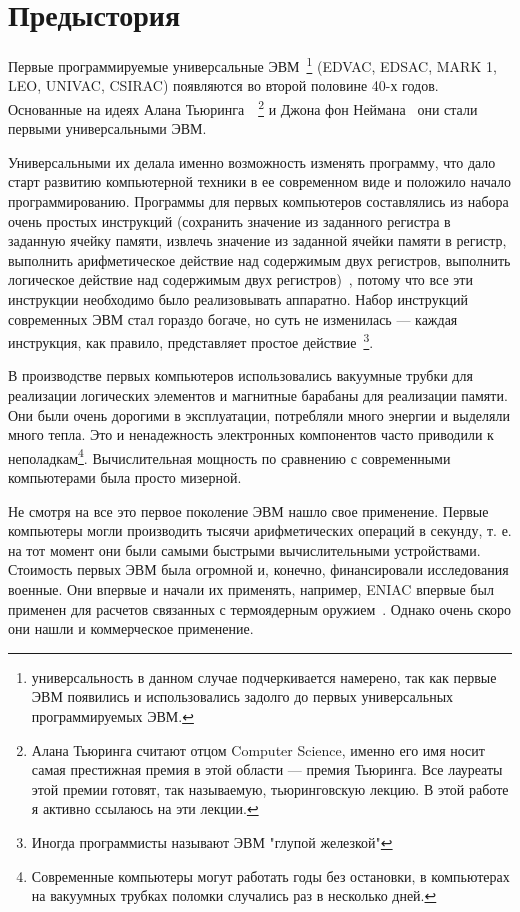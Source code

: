 \section{Предыстория}

Первые программируемые универсальные ЭВМ~\footnote{универсальность в данном случае подчеркивается намерено, так как первые ЭВМ появились и использовались задолго до первых универсальных программируемых ЭВМ.} (EDVAC, EDSAC, MARK 1, LEO, UNIVAC, CSIRAC) появляются во второй половине 40-х годов. Основанные на идеях Алана Тьюринга~\cite{Kowalik:TURING}~\footnote{Алана Тьюринга считают отцом Computer Science, именно его имя носит самая престижная премия в этой области — премия Тьюринга. Все лауреаты этой премии готовят, так называемую, тьюринговскую лекцию. В этой работе я активно ссылаюсь на эти лекции.} и Джона фон Неймана~\cite{Lee:VONNEUMANN} они стали первыми универсальными ЭВМ.

Универсальными их делала именно возможность изменять программу, что дало старт развитию компьютерной техники в ее современном виде и положило начало программированию. Программы для первых компьютеров составлялись из набора очень простых инструкций (сохранить значение из заданного регистра в заданную ячейку памяти, извлечь значение из заданной ячейки памяти в регистр, выполнить арифметическое действие над содержимым двух регистров, выполнить логическое действие над содержимым двух регистров)~\cite{Turing}, потому что все эти инструкции необходимо было реализовывать аппаратно. Набор инструкций современных ЭВМ стал гораздо богаче, но суть не изменилась — каждая инструкция, как правило, представляет простое действие~\footnote{Иногда программисты называют ЭВМ "глупой железкой"}.

В производстве первых компьютеров использовались вакуумные трубки для реализации логических элементов и магнитные барабаны для реализации памяти. Они были очень дорогими в эксплуатации, потребляли много энергии и выделяли много тепла. Это и ненадежность электронных компонентов часто приводили к неполадкам\footnote{Современные компьютеры могут работать годы без остановки, в компьютерах на вакуумных трубках поломки случались раз в несколько дней.}. Вычислительная мощность по сравнению с современными компьютерами была просто мизерной.

Не смотря на все это первое поколение ЭВМ нашло свое применение. Первые компьютеры могли производить тысячи арифметических операций в секунду, т. е. на тот момент они были самыми быстрыми вычислительными устройствами. Стоимость первых ЭВМ была огромной и, конечно, финансировали исследования военные. Они впервые и начали их применять, например, ENIAC впервые был применен для расчетов связанных с термоядерным оружием~\cite{Randall:2006:ENIAC}. Однако очень скоро они нашли и коммерческое применение.


